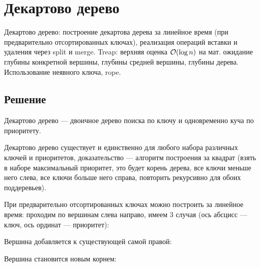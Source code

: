 \section{Декартово дерево}
Декартово дерево: построение декартова дерева за линейное время
(при предварительно отсортированных ключах),
реализация операций вставки и удаления через split и merge.
Treap: верхняя оценка $\mathcal{O}(\log n)$ на мат. ожидание
глубины конкретной вершины, глубины средней вершины,
глубины дерева.
Использование неявного ключа, rope.

\subsection{Решение}
Декартово дерево --- двоичное дерево поиска по ключу
и одновременно куча по приоритету.

Декартово дерево существует и единственно
для любого набора различных ключей и приоритетов,
доказательство --- алгоритм построения за квадрат
(взять в наборе максимальный приоритет,
это будет корень дерева,
все ключи меньше него слева,
все ключи больше него справа,
повторить рекурсивно для обоих поддеревьев).

При предварительно отсортированных ключах
можно построить за линейное время:
проходим по вершинам слева направо,
имеем 3 случая
(ось абсцисс --- ключ, ось ординат --- приоритет):

\bigskip

\noindent
\begin{minipage}{\textwidth}
    \begin{center}
        Вершина добавляется к существующей самой правой:

    \end{center}
\end{minipage}

\bigskip

\noindent
\begin{minipage}{\textwidth}
    \begin{center}
        Вершина становится новым корнем:

    \end{center}
\end{minipage}


